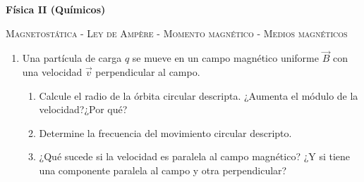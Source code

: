 \documentclass[11pt,spanish,a4paper]{article}
\begin{document}
\noindent
\textbf{Física II (Químicos)}\hfill {}
\begin{center}
  \textsc{\large Magnetostática - Ley de Ampère - Momento magnético - Medios magnéticos}
\par\end{center}{\large \par}


\begin{enumerate}

\section*{Magnetostática}

  \item Una partícula de carga \(q\) se mueve en un campo magnético uniforme \(\vec{B}\) con una velocidad \(\vec{v}\)
perpendicular al campo.
\begin{enumerate}
  \item  Calcule el radio de la órbita circular descripta.
¿Aumenta el módulo de la velocidad?¿Por qué?
  \item Determine la frecuencia del movimiento circular descripto.
  \item ¿Qué sucede si la velocidad es paralela al campo magnético? ¿Y si tiene una componente
paralela al campo y otra perpendicular?
\end{enumerate}


\end{enumerate}
\end{document}
